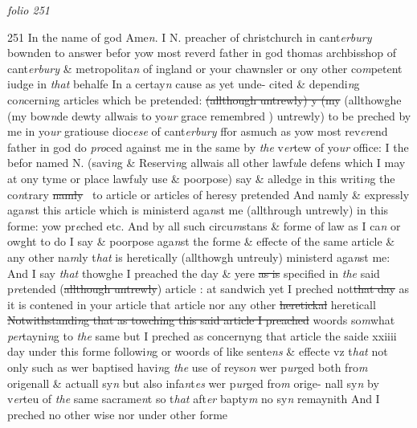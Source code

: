 \documentclass[12pt, a4paper]{book}
\begin{document}
\textit{folio 251}



{\color{Mahogany}251} In the name of god Ame\textit{n}. I N. preacher of christchurch in cant\textit{erbury} bownden to answer befor yow most reverd father in god thomas archbisshop of cant\textit{erbury} \& metropolita\textit{n} of ingland or your  chawnsler or ony other co\textit{m}petent iudge in \textit{that} behalfe In a certay\textit{n} cause as yet unde- cited \& dependi\textit{n}g co\textit{n}cerni\textit{n}g articles which be pretended: \sout{(allthough untrewly) y (my} (allthowghe (my bow\textit{n}de dewty allwais to yo\textit{ur} grace remembred
			 ) untrewly) to be preched by me in yo\textit{ur} gratiouse dioc\textit{ese} of cant\textit{erbury} ffor asmuch as yow most rev\textit{er}end father in god do \textit{pro}ced against me in the same by \textit{the} v\textit{er}tew of yo\textit{ur} office: I the befor named N. (savi\textit{n}g \& Reservi\textit{n}g allwais all other lawf\textit{u}le defens which I may at ony tyme or place lawf\textit{u}ly use \& poorpose) say \& alledge in this writi\textit{n}g the co\textit{n}trary \sout{namly}  to article or articles of heresy pretended And namly \& expressly aga\textit{n}st this article which is  ministerd aga\textit{n}st me (allthrough untrewly) in this forme: yow pr\textit{e}ched etc. And by all such circu\textit{m}stans \& forme of law as I ca\textit{n} or owght to do I say \&  poorpose aga\textit{n}st the forme \& effecte of the same article \& any other na\textit{m}ly t\textit{hat}  is heretically (allthowgh untreuly) ministerd aga\textit{n}st me: And I say \textit{that} thowghe I preached the day \& yere \sout{as is} specified in \textit{the} said p\textit{re}tended (\sout{allthough untrewly}) article : at sandwich yet I preched not\sout{that day}
               as it is contened in your article that article
			 nor any other \sout{heretickal }hereticall \sout{Notwithstandi\textit{n}g that as towching this said article I preached}  woords so\textit{m}what \textit{per}tayni\textit{n}g to \textit{the} same but I preched as concernyng that article the saide xxiiii day 
			under this forme followi\textit{n}g or woords of  like sente\textit{ns} \& effecte vz t\textit{hat} not only such as wer baptised havi\textit{n}g \textit{the} use of reyso\textit{n} wer p\textit{ur}ged both fro\textit{m} origenall \& actuall sy\textit{n} but also infa\textit{n}t\textit{es} wer p\textit{ur}ged fro\textit{m} orige- nall sy\textit{n} by v\textit{er}teu of \textit{the} same sacrame\textit{n}t so t\textit{hat} aft\textit{er} bapty\textit{m} no sy\textit{n} remaynith And I preched no other wise nor under other forme
\end{document}
